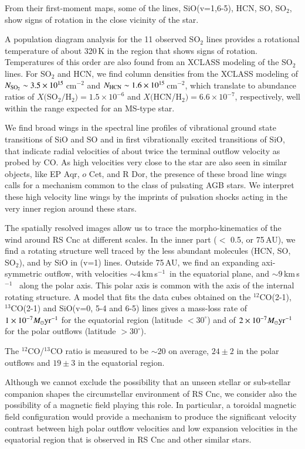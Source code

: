 \documentclass{aa}
\newcommand{\kms}{\,km\,s$^{-1}$~}
\begin{document}
From their first-moment maps, some of the lines, SiO(v=1,6-5), HCN,
SO, SO$_2$, show signs of rotation in the close vicinity of the star.

A population diagram analysis for the 11 observed SO$_2$ lines
provides a rotational temperature of about 320\,K in the region that
shows signs of rotation. Temperatures of this order are also  found
from an XCLASS modeling of the SO$_2$ lines.  For SO$_2$ and HCN, we
find column densities from the XCLASS modeling of $N_{\rm SO_2} \sim
3.5\times10^{15}$\,cm$^{-2}$ and $N_{\rm HCN} \sim 1.6 \times
10^{15}$\,cm$^{-2}$,  which translate to abundance ratios of
$X($SO$_2/$H$_2) = 1.5\times10^{-6}$ and $X($HCN/H$_2) =
6.6\times10^{-7}$, respectively, well within the range expected for an
MS-type star.

We find broad wings in the spectral line profiles of vibrational
ground state transitions of SiO and SO and in first vibrationally
excited transitions of SiO, that indicate radial velocities of about
twice the terminal outflow velocity as probed by CO.  As high
velocities very close to the star are also seen in similar objects,
like EP Aqr, $o$ Cet, and R Dor, the presence of these broad line wings
calls for a mechanism common to the class of pulsating AGB stars. We
interpret these high velocity line wings by the imprints of pulsation
shocks acting in the very inner region around these stars. 

The spatially resolved images allow us to trace the morpho-kinematics
of the wind around RS Cnc at different scales. In the inner part ($<$
0.5\arcsec, or 75\,AU), we find a rotating structure well traced by
the less abundant molecules (HCN, SO, SO$_2$), and by SiO in (v=1)
lines.  Outside 75\,AU, we find an expanding axi-symmetric outflow,
with velocities $\sim4$\kms in the equatorial plane, and $\sim9$\kms
along the polar axis. This polar axis is common with the axis of the
internal rotating structure. A model that fits the data cubes
obtained on the $^{12}$CO(2-1), $^{13}$CO(2-1) and SiO(v=0, 5-4 and
6-5) lines gives a mass-loss rate of $1 \times 10^{-7}M_\odot{\rm
yr}^{-1}$ for the equatorial region (latitude $< 30^\circ$) and of $2
\times 10^{-7}M_\odot{\rm yr}^{-1}$ for the polar outflows (latitude
$> 30^\circ$).

The $^{12}$CO/$^{13}$CO ratio is measured to be $\sim20$ on average,
$24\pm2$ in the polar outflows and $19\pm3$ in the equatorial region.

Although we cannot exclude the possibility that an unseen stellar or
sub-stellar companion shapes the circumstellar environment of RS Cnc,
we consider also the possibility of a magnetic field playing this
role. In particular, a toroidal magnetic field configuration would
provide a mechanism to produce the significant velocity contrast
between high polar outflow velocities and low expansion velocities in
the equatorial region that is observed in RS Cnc and other similar
stars.
\end{document}
